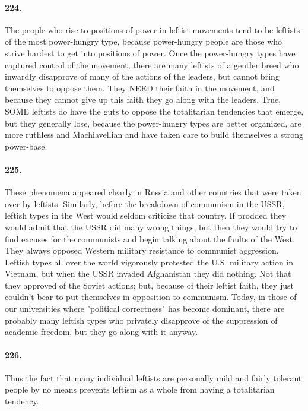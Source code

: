 \documentclass[12pt]{book}
\begin{document}
\paragraph{224.}  The people who rise to positions of power in leftist movements tend to be leftists of the most power-hungry type, because power-hungry people are those who strive hardest to get into positions of power. Once the power-hungry types have captured control of the movement, there are many leftists of a gentler breed who inwardly disapprove of many of the actions of the leaders, but cannot bring themselves to oppose them. They NEED their faith in the movement, and because they cannot give up this faith they go along with the leaders. True, SOME leftists do have the guts to oppose the totalitarian tendencies that emerge, but they generally lose, because the power-hungry types are better organized, are more ruthless and Machiavellian and have taken care to build themselves a strong power-base.


\paragraph{225.} These phenomena appeared clearly in Russia and other countries that were taken over by leftists. Similarly, before the breakdown of communism in the USSR, leftish types in the West would seldom criticize that country. If prodded they would admit that the USSR did many wrong things, but then they would try to find excuses for the communists and begin talking about the faults of the West. They always opposed Western military resistance to communist aggression. Leftish types all over the world vigorously protested the U.S. military action in Vietnam, but when the USSR invaded Afghanistan they did nothing. Not that they approved of the Soviet actions; but, because of their leftist faith, they just couldn't bear to put themselves in opposition to communism. Today, in those of our universities where "political correctness" has become dominant, there are probably many leftish types who privately disapprove of the suppression of academic freedom, but they go along with it anyway.


\paragraph{226.} Thus the fact that many individual leftists are personally mild and fairly tolerant people by no means prevents leftism as a whole from having a totalitarian tendency.
\end{document}
